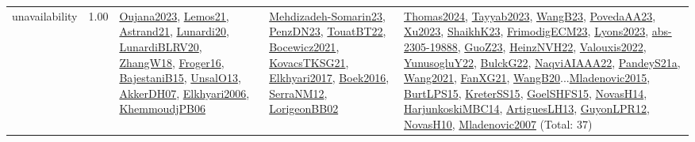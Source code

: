 {\begin{longtable}{p{3cm}r>{\raggedright\arraybackslash}p{6cm}>{\raggedright\arraybackslash}p{6cm}>{\raggedright\arraybackslash}p{8cm}}
\index{unavailability}\index{Concepts!unavailability}unavailability &  1.00 & \hyperref[detail:Oujana2023]{Oujana2023}, \hyperref[detail:Lemos21]{Lemos21}, \hyperref[detail:Astrand21]{Astrand21}, \hyperref[detail:Lunardi20]{Lunardi20}, \hyperref[detail:LunardiBLRV20]{LunardiBLRV20}, \hyperref[detail:ZhangW18]{ZhangW18}, \hyperref[detail:Froger16]{Froger16}, \hyperref[detail:BajestaniB15]{BajestaniB15}, \hyperref[detail:UnsalO13]{UnsalO13}, \hyperref[detail:AkkerDH07]{AkkerDH07}, \hyperref[detail:Elkhyari2006]{Elkhyari2006}, \hyperref[detail:KhemmoudjPB06]{KhemmoudjPB06} & \hyperref[detail:Mehdizadeh-Somarin23]{Mehdizadeh-Somarin23}, \hyperref[detail:PenzDN23]{PenzDN23}, \hyperref[detail:TouatBT22]{TouatBT22}, \hyperref[detail:Bocewicz2021]{Bocewicz2021}, \hyperref[detail:KovacsTKSG21]{KovacsTKSG21}, \hyperref[detail:Elkhyari2017]{Elkhyari2017}, \hyperref[detail:Boek2016]{Boek2016}, \hyperref[detail:SerraNM12]{SerraNM12}, \hyperref[detail:LorigeonBB02]{LorigeonBB02} & \hyperref[detail:Thomas2024]{Thomas2024}, \hyperref[detail:Tayyab2023]{Tayyab2023}, \hyperref[detail:WangB23]{WangB23}, \hyperref[detail:PovedaAA23]{PovedaAA23}, \hyperref[detail:Xu2023]{Xu2023}, \hyperref[detail:ShaikhK23]{ShaikhK23}, \hyperref[detail:FrimodigECM23]{FrimodigECM23}, \hyperref[detail:Lyons2023]{Lyons2023}, \hyperref[detail:abs-2305-19888]{abs-2305-19888}, \hyperref[detail:GuoZ23]{GuoZ23}, \hyperref[detail:HeinzNVH22]{HeinzNVH22}, \hyperref[detail:Valouxis2022]{Valouxis2022}, \hyperref[detail:YunusogluY22]{YunusogluY22}, \hyperref[detail:BulckG22]{BulckG22}, \hyperref[detail:NaqviAIAAA22]{NaqviAIAAA22}, \hyperref[detail:PandeyS21a]{PandeyS21a}, \hyperref[detail:Wang2021]{Wang2021}, \hyperref[detail:FanXG21]{FanXG21}, \hyperref[detail:WangB20]{WangB20}...\hyperref[detail:Mladenovic2015]{Mladenovic2015}, \hyperref[detail:BurtLPS15]{BurtLPS15}, \hyperref[detail:KreterSS15]{KreterSS15}, \hyperref[detail:GoelSHFS15]{GoelSHFS15}, \hyperref[detail:NovasH14]{NovasH14}, \hyperref[detail:HarjunkoskiMBC14]{HarjunkoskiMBC14}, \hyperref[detail:ArtiguesLH13]{ArtiguesLH13}, \hyperref[detail:GuyonLPR12]{GuyonLPR12}, \hyperref[detail:NovasH10]{NovasH10}, \hyperref[detail:Mladenovic2007]{Mladenovic2007} (Total: 37)\\
\end{longtable}
}

\clearpage
